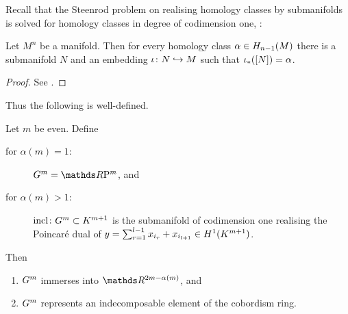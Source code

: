 Recall that the Steenrod problem on realising homology classes by
submanifolds is solved for homology classes in degree of codimension
one, \idest:
\begin{Lem}
  Let $M^n$ be a manifold. Then for every homology class
  $\alpha\in H_{n-1}(M)$ there is a submanifold $N$ and an embedding
  $\iota\colon N\hookrightarrow M$ such that ${\iota}_*([N]) = \alpha$.
  \begin{proof}
    See \cite[Theorem~II.26]{thom}.
  \end{proof}
\end{Lem}
Thus the following is well-defined.
\begin{LemDef}\label{lem:evengen}
  Let $m$ be even. Define
  \begin{description}
  \item[for $\alpha(m)=1$:] $\G m = \RP m$, and
  \item[for $\alpha(m)>1$:]
    $\mathrm{incl}\colon G^{m}\subset K^{m+1}$ is the submanifold of
    codimension one realising the Poincaré dual of
    $y=\sum_{r=1}^{l-1}x_{i_r} + x_{i_{l+1}}\in H^1(K^{m+1})$.
  \end{description}
  Then
  \begin{enumerate}
  \item\label{lem:evengen:immersionprop}
    $G^{m}$ immerses into $\R^{2m-\alpha(m)}$, and
  \item\label{lem:evengen:indecomposable}
    $G^{m}$ represents an indecomposable element of the
    cobordism ring.
  \end{enumerate}
\end{LemDef}
